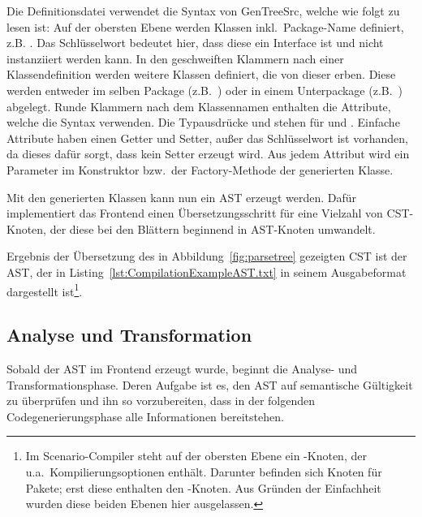 Die Definitionsdatei verwendet die Syntax von GenTreeSrc, welche wie folgt zu lesen ist:
Auf der obersten Ebene werden Klassen inkl.\ Package-Name definiert, z.B. . %
Das Schlüsselwort  bedeutet hier, dass diese ein Interface ist und nicht instanziiert werden kann.
In den geschweiften Klammern nach einer Klassendefinition werden weitere Klassen definiert, die von dieser erben.
Diese werden entweder im selben Package (z.B.\ ) oder in einem Unterpackage (z.B.\ ) abgelegt.
Runde Klammern nach dem Klassennamen enthalten die Attribute, welche die Syntax  verwenden.
Die Typausdrücke \code{[T]} und \code{[T:U]} stehen für  und .
Einfache Attribute haben einen Getter und Setter, außer das Schlüsselwort  ist vorhanden, da dieses dafür sorgt, dass kein Setter erzeugt wird.
Aus jedem Attribut wird ein Parameter im Konstruktor bzw.\ der Factory-Methode der generierten Klasse.

Mit den generierten Klassen kann nun ein AST erzeugt werden.
Dafür implementiert das Frontend einen Übersetzungsschritt für eine Vielzahl von CST-Knoten, der diese bei den Blättern beginnend in AST-Knoten umwandelt.

Ergebnis der Übersetzung des in Abbildung~\ref{fig:parsetree} gezeigten CST ist der AST, der in Listing~\ref{lst:CompilationExampleAST.txt} in seinem Ausgabeformat dargestellt ist\footnote{
    Im Scenario-Compiler steht auf der obersten Ebene ein -Knoten, der u.a.\ Kompilierungsoptionen enthält.
    Darunter befinden sich Knoten für Pakete;
    erst diese enthalten den -Knoten.
    Aus Gründen der Einfachheit wurden diese beiden Ebenen hier ausgelassen.
}.


\subsection{Analyse und Transformation}\label{subsec:data-model-gentreesrc}

Sobald der AST im Frontend erzeugt wurde, beginnt die Analyse- und Transformationsphase.
Deren Aufgabe ist es, den AST auf semantische Gültigkeit zu überprüfen und ihn so vorzubereiten, dass in der folgenden Codegenerierungsphase alle Informationen bereitstehen.

